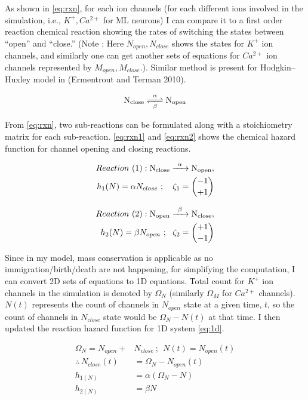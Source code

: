 \documentclass[
]{article}
\begin{document}
As shown in \eqref{eq:rxn}, for each ion channels (for each different ions involved in the simulation, i.e., \(K^+, Ca^{2+}\) for ML neurons) I can compare it to a first order reaction chemical reaction showing the rates of switching the states between ``open'' and ``close.'' (Note : Here \(N_{open}, N_{close}\) shows the states for \(K^+\) ion channels, and similarly one can get another sets of equations for \(Ca^{2+}\) ion channels represented by \(M_{open},M_{close}\).). Similar method is present for Hodgkin--Huxley model in (Ermentrout and Terman 2010).

\begin{equation} \label{eq:rxn} 
\ce{ N_{close} <=>[\alpha][\beta] N_{open} }
\end{equation}

From \eqref{eq:rxn}, two sub-reactions can be formulated along with a stoichiometry matrix for each sub-reaction. \eqref{eq:rxn1} and \eqref{eq:rxn2} shows the chemical hazard function for channel opening and closing reactions.

\begin{equation} \label{eq:rxn1}
\begin{split}
Reaction\ (1): \ce{ N_{close} ->[\alpha] N_{open} },
\\ h_1(N) = \alpha N_{close}\ ;\ \ \ \zeta_1=\binom{-1}{+1}  
\end{split}
\end{equation}

\begin{equation} \label{eq:rxn2}
\begin{split}
Reaction\ (2): \ce{ N_{open} ->[\beta] N_{close} },
\\ h_2(N) = \beta N_{open}\ ;\ \ \zeta_2=\binom{+1}{-1}
\end{split}
\end{equation}

Since in my model, mass conservation is applicable as no immigration/birth/death are not happening, for simplifying the computation, I can convert 2D sets of equations to 1D equations. Total count for \(K^+\) ion channels in the simulation is denoted by \(\Omega_N\) (similarly \(\Omega_M\) for \(Ca^{2+}\) channels). \(N(t)\) represents the count of channels in \(N_{open}\) state at a given time, \(t\), so the count of channels in \(N_{close}\) state would be \(\Omega_N - N(t)\) at that time. I then updated the reaction hazard function for 1D system \eqref{eq:1d}.

\begin{equation} \label{eq:1d}
\begin{split}
\Omega_N = N_{open} + &N_{close}\ ;\ \ N(t) = N_{open}(t)
\\ \therefore\ N_{close}(t) &= \Omega_N - N_{open}(t) 
\\ h_{1(N)} & = \alpha (\Omega_N - N)
\\ h_{2(N)} &= \beta N 
\end{split}
\end{equation}
\end{document}
